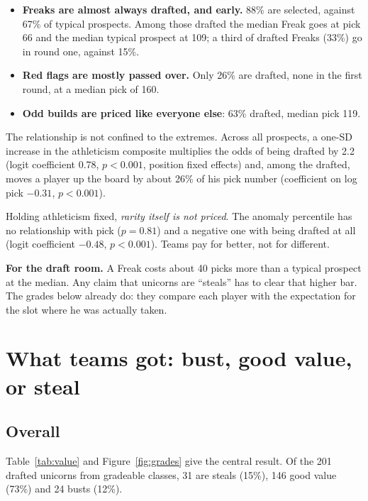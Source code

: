 \documentclass[11pt]{article}
\newcommand{\takeaway}[1]{\par\smallskip\noindent\colorbox{boxbg}{\parbox{\dimexpr\linewidth-2\fboxsep}{\sffamily\small #1}}\par\smallskip}
\begin{document}
\begin{itemize}[leftmargin=1.4em]
\item \textbf{Freaks are almost always drafted, and early.} 88\% are selected, against 67\% of typical prospects. Among those drafted the median Freak goes at pick 66 and the median typical prospect at 109; a third of drafted Freaks (33\%) go in round one, against 15\%.
\item \textbf{Red flags are mostly passed over.} Only 26\% are drafted, none in the first round, at a median pick of 160.
\item \textbf{Odd builds are priced like everyone else}: 63\% drafted, median pick 119.
\end{itemize}

The relationship is not confined to the extremes. Across all prospects, a one-SD increase in the athleticism composite multiplies the odds of being drafted by 2.2 (logit coefficient 0.78, $p<0.001$, position fixed effects) and, among the drafted, moves a player up the board by about 26\% of his pick number (coefficient on log pick $-0.31$, $p<0.001$).

Holding athleticism fixed, \emph{rarity itself is not priced}. The anomaly percentile has no relationship with pick ($p=0.81$) and a negative one with being drafted at all (logit coefficient $-0.48$, $p<0.001$). Teams pay for better, not for different.

\takeaway{\textbf{For the draft room.} A Freak costs about 40 picks more than a typical prospect at the median. Any claim that unicorns are ``steals'' has to clear that higher bar. The grades below already do: they compare each player with the expectation for the slot where he was actually taken.}

\section{What teams got: bust, good value, or steal}\label{sec:results}

\subsection{Overall}

Table~\ref{tab:value} and Figure~\ref{fig:grades} give the central result. Of the 201 drafted unicorns from gradeable classes, 31 are steals (15\%), 146 good value (73\%) and 24 busts (12\%).
\end{document}
